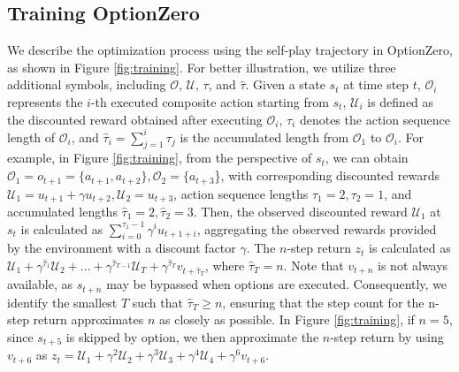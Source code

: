 \subsection{Training OptionZero}\label{sec:ozero-training}
We describe the optimization process using the self-play trajectory in OptionZero, as shown in Figure \ref{fig:training}.
For better illustration, we utilize three additional symbols, including $\mathcal{O}$, $\mathcal{U}$, $\tau$, and $\hat{\tau}$.
Given a state $s_t$ at time step $t$, $\mathcal{O}_i$ represents the $i$-th executed composite action starting from $s_t$, $\mathcal{U}_i$ is defined as the discounted reward obtained after executing $\mathcal{O}_i$, $\tau_i$ denotes the action sequence length of $\mathcal{O}_i$, and $\hat{\tau}_i=\sum_{j=1}^i\tau_j$ is the accumulated length from $\mathcal{O}_1$ to $\mathcal{O}_i$.
For example, in Figure \ref{fig:training}, from the perspective of $s_t$, we can obtain $\mathcal{O}_1=o_{t+1}=\{a_{t+1}, a_{t+2}\}, \mathcal{O}_2=\{a_{t+3}$\}, with corresponding discounted rewards $\mathcal{U}_1=u_{t+1}+\gamma u_{t+2}, \mathcal{U}_2=u_{t+3}$, action sequence lengths $\tau_1=2, \tau_2=1$, and accumulated lengths $\hat{\tau}_1=2, \hat{\tau}_2=3$.
Then, the observed discounted reward $\mathcal{U}_1$ at $s_t$ is calculated as $\sum_{i=0}^{\tau_1-1}\gamma^i u_{t+1+i}$, aggregating the observed rewards provided by the environment with a discount factor $\gamma$.
The $n$-step return $z_t$ is calculated as $\mathcal{U}_1 + \gamma^{\hat{\tau}_1} \mathcal{U}_2 + ... + \gamma^{\hat{\tau}_{T-1}} \mathcal{U}_T + \gamma^{\hat{\tau}_T} v_{t+\hat{\tau}_T}$, where $\hat{\tau}_T=n$.
Note that $v_{t+n}$ is not always available, as $s_{t+n}$ may be bypassed when options are executed.
Consequently, we identify the smallest $T$ such that $\hat{\tau}_T\geq n$, ensuring that the step count for the n-step return approximates $n$ as closely as possible.
In Figure \ref{fig:training}, if $n=5$, since $s_{t+5}$ is skipped by option, we then approximate the $n$-step return by using $v_{t+6}$ as $z_t=\mathcal{U}_1 + \gamma^2 \mathcal{U}_2 + \gamma^3 \mathcal{U}_3 + \gamma^4 \mathcal{U}_4 + \gamma^6 v_{t+6}$.

